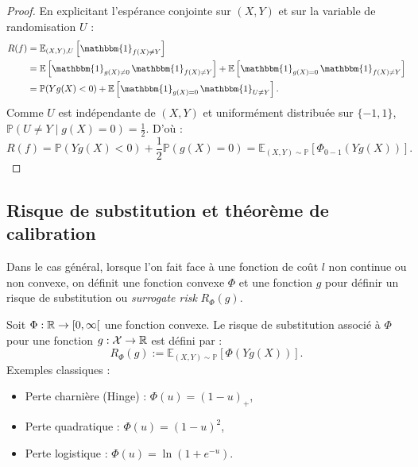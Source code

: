 \begin{proof}
    En explicitant l'espérance conjointe sur $(X,Y)$ et sur la variable de randomisation $U$ :
    \begin{align*}
        R(f) &= \mathbb{E}_{(X,Y), U}\left[ \mathbbm{1}_{f(X) \neq Y} \right] \\
        &= \mathbb{E}\left[ \mathbbm{1}_{g(X) \neq 0} \, \mathbbm{1}_{f(X) \neq Y} \right] + \mathbb{E}\left[ \mathbbm{1}_{g(X) = 0} \, \mathbbm{1}_{f(X) \neq Y} \right] \\
        &= \mathbb{P}(Y g(X) < 0) + \mathbb{E}\left[ \mathbbm{1}_{g(X) = 0} \, \mathbbm{1}_{U \neq Y} \right].
    \end{align*}
    Comme $U$ est indépendante de $(X, Y)$ et uniformément distribuée sur $\{-1, 1\}$, $\mathbb{P}(U \neq Y \mid g(X) = 0) = \frac{1}{2}$. D'où :
    \begin{equation*}
        R(f) = \mathbb{P}(Y g(X) < 0) + \frac{1}{2} \mathbb{P}(g(X) = 0) = \mathbb{E}_{(X,Y) \sim \mathbb{P}} \left[ \Phi_{0-1}(Y g(X)) \right].
    \end{equation*}
\end{proof}

\subsection{Risque de substitution et théorème de calibration}

Dans le cas général, lorsque l'on fait face à une fonction de coût $l$ non continue ou non convexe, on définit une fonction convexe $ \Phi$ et une fonction $g$ pour définir un risque de substitution ou \emph{surrogate risk} $R_\Phi(g)$. 

\begin{definition}
    Soit $\Phi : \mathbb{R} \to [0, \infty[$ une fonction convexe. Le risque de substitution associé à $\Phi$ pour une fonction $g : \mathcal{X} \to \mathbb{R}$ est défini par :
    \begin{equation}
        R_\Phi(g) := \mathbb{E}_{(X,Y) \sim \mathbb{P}} \left[ \Phi(Y g(X)) \right].
    \end{equation}
    Exemples classiques :
    \begin{itemize}
        \item Perte charnière (Hinge) : $\Phi(u) = (1 - u)_+$,
        \item Perte quadratique : $\Phi(u) = (1 - u)^2$,
        \item Perte logistique : $\Phi(u) = \ln(1 + e^{-u})$.
    \end{itemize}
\end{definition}

